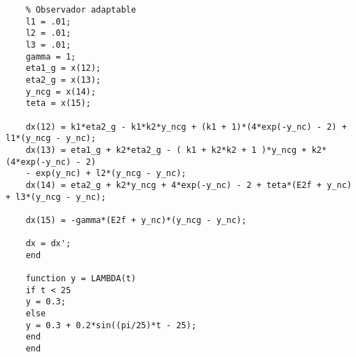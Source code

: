 \begin{verbatim}
	% Observador adaptable
	l1 = .01;
	l2 = .01;
	l3 = .01;
	gamma = 1;
	eta1_g = x(12);
	eta2_g = x(13);
	y_ncg = x(14);
	teta = x(15);
	
	dx(12) = k1*eta2_g - k1*k2*y_ncg + (k1 + 1)*(4*exp(-y_nc) - 2) + l1*(y_ncg - y_nc);
	dx(13) = eta1_g + k2*eta2_g - ( k1 + k2*k2 + 1 )*y_ncg + k2*(4*exp(-y_nc) - 2) 
	- exp(y_nc) + l2*(y_ncg - y_nc);
	dx(14) = eta2_g + k2*y_ncg + 4*exp(-y_nc) - 2 + teta*(E2f + y_nc) + l3*(y_ncg - y_nc);
	
	dx(15) = -gamma*(E2f + y_nc)*(y_ncg - y_nc);
	
	dx = dx';
	end
	
	function y = LAMBDA(t)
	if t < 25
	y = 0.3;
	else
	y = 0.3 + 0.2*sin((pi/25)*t - 25);
	end
	end
	\end{verbatim}
	